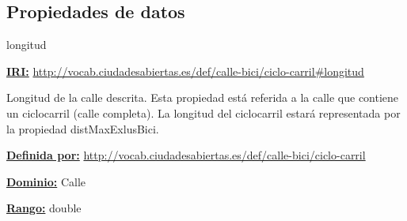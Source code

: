\subsection{Propiedades de datos}


\begin{mybox}{longitud}
\begin{flushleft}
\underline{\textbf{IRI:}}
\url{http://vocab.ciudadesabiertas.es/def/calle-bici/ciclo-carril#longitud}
\newline

Longitud de la calle descrita. Esta propiedad está referida a la calle que contiene un ciclocarril (calle completa). La longitud del ciclocarril estará representada por la propiedad distMaxExlusBici.
\newline

\underline{\textbf{Definida por:}}
\url{http://vocab.ciudadesabiertas.es/def/calle-bici/ciclo-carril}
\newline

\underline{\textbf{Dominio:}}
	Calle
\newline

\underline{\textbf{Rango:}}
		double
\newline

\end{flushleft}
\end{mybox}



